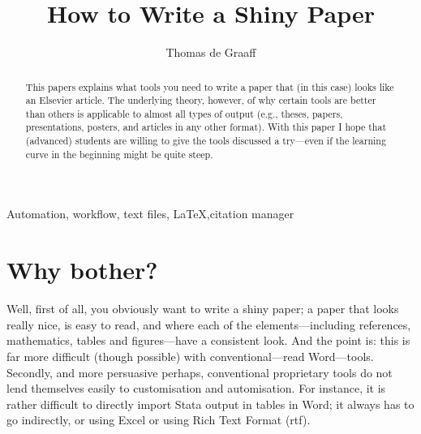 \documentclass[preprint,authoryear,3p]{elsarticle}
\begin{document}
\begin{frontmatter}
	
	\title{How to Write a Shiny Paper}  
	\author{Thomas de Graaff}   \address{Department of Spatial Economics, Vrije Universiteit}
	\begin{abstract}
		This papers explains what tools you need to write a paper that (in this case) looks like an Elsevier article. The underlying theory, however, of why certain tools are better than others is applicable to almost all types of output (e.g., theses, papers, presentations, posters, and articles in any other format). With this paper I hope that (advanced) students are willing to give the tools discussed a try---even if the learning curve in the beginning might be quite steep. 
	\end{abstract}
	\begin{keyword}
		Automation, workflow, text files, \LaTeX \sep citation manager 
	\end{keyword}
\end{frontmatter}

\section{Why bother?} Well, first of all, you obviously want to write a shiny paper; a paper that looks really nice, is easy to read, and where each of the elements---including references, mathematics, tables and figures---have a consistent look. And the point is: this is far more difficult (though possible) with conventional---read Word---tools. Secondly, and more persuasive perhaps, conventional proprietary tools do not lend themselves easily to customisation and automisation. For instance, it is rather difficult to directly import Stata output in tables in Word; it always has to go indirectly, or using Excel or using Rich Text Format (rtf). 
\end{document}
